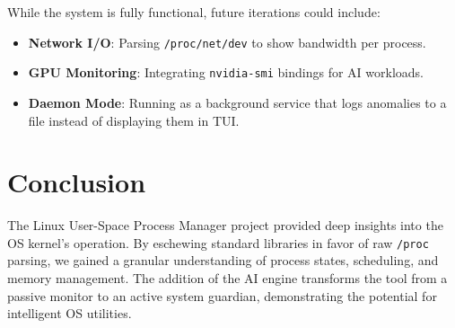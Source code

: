 \documentclass[a4paper,12pt]{article}
\begin{document}
While the system is fully functional, future iterations could include:
\begin{itemize}
    \item \textbf{Network I/O}: Parsing \texttt{/proc/net/dev} to show bandwidth per process.
    \item \textbf{GPU Monitoring}: Integrating \texttt{nvidia-smi} bindings for AI workloads.
    \item \textbf{Daemon Mode}: Running as a background service that logs anomalies to a file instead of displaying them in TUI.
\end{itemize}

\section{Conclusion}

The Linux User-Space Process Manager project provided deep insights into the OS kernel's operation. By eschewing standard libraries in favor of raw \texttt{/proc} parsing, we gained a granular understanding of process states, scheduling, and memory management. The addition of the AI engine transforms the tool from a passive monitor to an active system guardian, demonstrating the potential for intelligent OS utilities.
\end{document}

